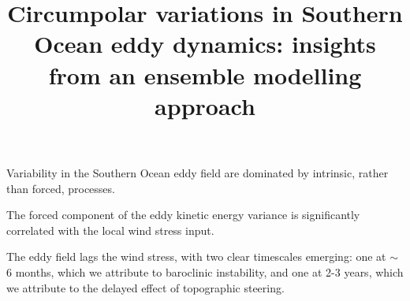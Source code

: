 \documentclass{agujournal2019}
\begin{document}
\justify
\title{Circumpolar variations in Southern Ocean eddy dynamics: insights from an ensemble modelling approach}




\begin{keypoints}
\item Variability in the Southern Ocean eddy field are dominated by intrinsic, rather than forced, processes.
\item The forced component of the eddy kinetic energy variance is significantly correlated with the local wind stress input.
\item The eddy field lags the wind stress, with two clear timescales emerging: one at $\sim$6 months, which we attribute to baroclinic instability, and one at 2-3 years, which we attribute to the delayed effect of topographic steering.
\end{keypoints}
\end{document}
